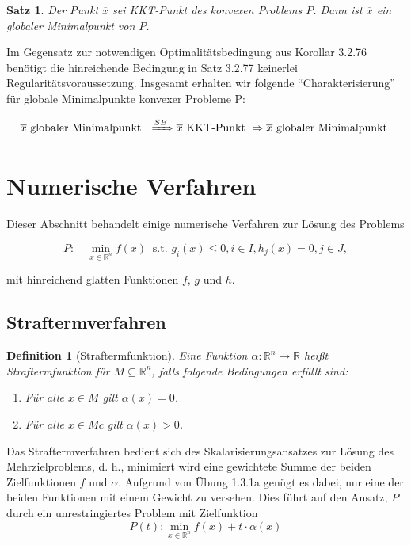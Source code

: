 \documentclass[11pt]{scrreprt}
\newcounter{thm}
\theoremstyle{thmstyle}
\numberwithin{thm}{section}
\newtheorem{definition}[thm]{Definition}
\newtheorem{satz}[thm]{Satz}
\begin{document}
\begin{satz}
	Der Punkt $\overline{x}$ sei KKT-Punkt des konvexen Problems $P$. Dann ist $\overline{x}$ ein globaler Minimalpunkt von $P$.
\end{satz}

Im Gegensatz zur notwendigen Optimalitätsbedingung aus Korollar 3.2.76 benötigt die hinreichende Bedingung in Satz 3.2.77 keinerlei Regularitätsvoraussetzung. Insgesamt erhalten wir folgende \enquote{Charakterisierung} für globale Minimalpunkte konvexer Probleme P:

	$$ \overline{x} \text{ globaler Minimalpunkt } \xRightarrow[]{SB} \overline{x} \text{ KKT-Punkt } \Rightarrow \overline{x} \text{ globaler Minimalpunkt } $$

\section{Numerische Verfahren}

Dieser Abschnitt behandelt einige numerische Verfahren zur Lösung des Problems

$$ P: \quad \min_{x \in \mathbb{R}^n} f(x) ~\text{ s.t. } g_i(x) \leq 0, i \in I, h_j(x) = 0, j \in J, $$

mit hinreichend glatten Funktionen $f$, $g$ und $h$.

\subsection*{Straftermverfahren}

\begin{definition}[Straftermfunktion]
	Eine Funktion $\alpha \colon \mathbb{R}^n \rightarrow \mathbb{R}$ heißt Straftermfunktion für $M \subseteq \mathbb{R}^n$, falls folgende Bedingungen erfüllt sind:
	\begin{enumerate}[label=\alph*\upshape)]
		\item Für alle $x \in M$ gilt $\alpha(x) = 0$.
		\item Für alle $x \in Mc$ gilt $\alpha(x) > 0$.
	\end{enumerate}	
\end{definition}

Das Straftermverfahren bedient sich des Skalarisierungsansatzes zur Lösung des Mehrzielproblems, d. h., minimiert wird eine gewichtete Summe der beiden Zielfunktionen $f$ und $\alpha$. Aufgrund von Übung 1.3.1a genügt es dabei, nur eine der beiden Funktionen mit einem Gewicht zu versehen. Dies führt auf den Ansatz, $P$ durch ein unrestringiertes Problem mit Zielfunktion
$$ P(t): \min_{x \in \mathbb{R}^n} f(x) + t \cdot \alpha(x) $$
\end{document}
